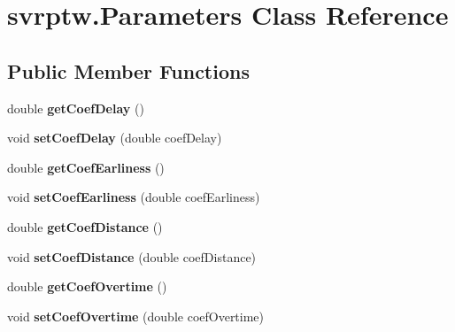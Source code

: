 \hypertarget{classsvrptw_1_1_parameters}{}\section{svrptw.\+Parameters Class Reference}
\label{classsvrptw_1_1_parameters}
\subsection*{Public Member Functions}
\begin{DoxyCompactItemize}
\item 
double {\bfseries get\+Coef\+Delay} ()\hypertarget{classsvrptw_1_1_parameters_ab2ed998a1a64e61b1ab7270635131974}{}\label{classsvrptw_1_1_parameters_ab2ed998a1a64e61b1ab7270635131974}

\item 
void {\bfseries set\+Coef\+Delay} (double coef\+Delay)\hypertarget{classsvrptw_1_1_parameters_aa804d7babd390ad13d00876345f93ead}{}\label{classsvrptw_1_1_parameters_aa804d7babd390ad13d00876345f93ead}

\item 
double {\bfseries get\+Coef\+Earliness} ()\hypertarget{classsvrptw_1_1_parameters_a4d22223bb4ca347d5f7a423a44e7fe90}{}\label{classsvrptw_1_1_parameters_a4d22223bb4ca347d5f7a423a44e7fe90}

\item 
void {\bfseries set\+Coef\+Earliness} (double coef\+Earliness)\hypertarget{classsvrptw_1_1_parameters_ab55564531a93527c6bdbd22c47a00192}{}\label{classsvrptw_1_1_parameters_ab55564531a93527c6bdbd22c47a00192}

\item 
double {\bfseries get\+Coef\+Distance} ()\hypertarget{classsvrptw_1_1_parameters_acbbf806b7e39aaece8ce03299381d116}{}\label{classsvrptw_1_1_parameters_acbbf806b7e39aaece8ce03299381d116}

\item 
void {\bfseries set\+Coef\+Distance} (double coef\+Distance)\hypertarget{classsvrptw_1_1_parameters_a1cdb8d4aeff5219690caf7f918c30ba9}{}\label{classsvrptw_1_1_parameters_a1cdb8d4aeff5219690caf7f918c30ba9}

\item 
double {\bfseries get\+Coef\+Overtime} ()\hypertarget{classsvrptw_1_1_parameters_ada66d703b8532c280e96cfb654968031}{}\label{classsvrptw_1_1_parameters_ada66d703b8532c280e96cfb654968031}

\item 
void {\bfseries set\+Coef\+Overtime} (double coef\+Overtime)\hypertarget{classsvrptw_1_1_parameters_a0a2e8c64866b977617a9ffff390c0228}{}\label{classsvrptw_1_1_parameters_a0a2e8c64866b977617a9ffff390c0228}


\end{DoxyCompactItemize}
